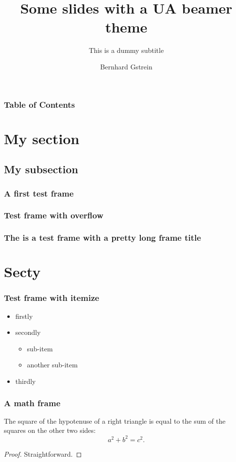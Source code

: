 \documentclass[pdflatex,compress]{beamer}
\title{Some slides with a UA beamer theme}
\subtitle{This is a dummy subtitle}
\author{Bernhard Gstrein}
\begin{document}
\maketitle

\begin{frame}
\frametitle{Table of Contents}
\tableofcontents
\end{frame}

\section{My section}
\subsection{My subsection}


\begin{frame}
\frametitle{A first test frame}
\lipsum[1] \cite{Nagy2008}
\end{frame}


\begin{frame}
\frametitle{Test frame with overflow}
\lipsum%
\end{frame}

\begin{frame}
\frametitle{The is a test frame with a pretty long frame title}
\lipsum
\end{frame}

\section{Secty}


\begin{frame}
\frametitle{Test frame with itemize}

\begin{itemize}
    \item<1-> firstly
    \item<2-> secondly
        \begin{itemize}
            \item sub-item
            \item another sub-item
        \end{itemize}
      \item<3-> thirdly
\end{itemize}

\end{frame}


\begin{frame}
\frametitle{A math frame}

\begin{theorem}[Pythagoras]
The square of the hypotenuse of a \alert{right} triangle is equal to the sum of the squares on the other two sides:
\[
a^2 + b^2 = c^2.
\]
\end{theorem}
\begin{proof}
Straightforward.
\end{proof}

\end{frame}
\end{document}
